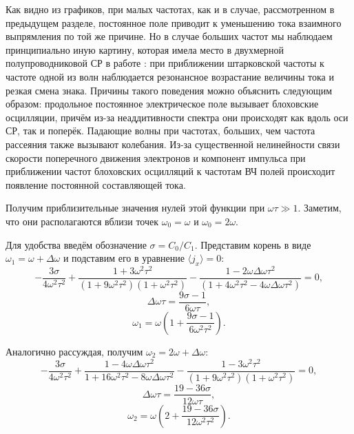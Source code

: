 Как видно из графиков, при малых частотах, как и в случае, рассмотренном в предыдущем разделе, постоянное поле приводит к уменьшению тока взаимного выпрямления по той же причине. Но в случае больших частот мы наблюдаем принципиально иную картину, которая имела место в двухмерной полупроводниковой СР в работе \cite{two-axis-sl}: при приближении штарковской частоты к частоте одной из волн наблюдается резонансное возрастание величины тока и резкая смена знака. Причины такого поведения можно объяснить следующим образом: продольное постоянное электрическое поле вызывает блоховские осцилляции, причём из-за неаддитивности спектра они происходят как вдоль оси СР, так и поперёк. Падающие волны при частотах, больших, чем частота рассеяния также вызывают колебания. Из-за существенной нелинейности связи скорости поперечного движения электронов и компонент импульса при приближении частот блоховских осцилляций к частотам ВЧ полей происходит появление постоянной составляющей тока.


Получим приблизительные значения нулей этой функции при \( \omega\tau\gg1 \).
Заметим, что они располагаются вблизи точек \( \omega_0 = \omega \) и \(
\omega_0 = 2\omega \).

Для удобства введём обозначение \( \sigma = C_0/C_1 \). Представим корень в виде
\( \omega_1 = \omega + \Delta\omega \) и подставим его в уравнение \( \langle
j_x \rangle = 0\):
\begin{equation*}
    -\frac{3\sigma}{4\omega^2\tau^2} +
    \frac{1+3\omega^2\tau^2}{(1+9\omega^2\tau^2)(1+\omega^2\tau^2)}-
    \frac{1-2\omega\Delta\omega\tau^2}{(1+4\omega^2\tau^2 -
    4\omega\Delta\omega\tau^2)}=0,
\end{equation*}
\begin{equation*}
    \Delta\omega\tau=\frac{9\sigma-1}{6\omega\tau},
\end{equation*}
\begin{equation*}
    \omega_1=\omega\left(1+\frac{9\sigma-1}{6\omega^2\tau^2}\right).
\end{equation*}

Аналогично рассуждая, получим \( \omega_2 = 2\omega + \Delta\omega \):
\begin{equation*}
    -\frac{3\sigma}{4\omega^2\tau^2} +
    \frac{1-4\omega\Delta\omega\tau^2}{1+16\omega^2\tau^2 -
    8\omega\Delta\omega\tau^2}-
    \frac{1-3\omega^2\tau^2}{(1+9\omega^2\tau^2)(1+\omega^2\tau^2)}=0,
\end{equation*}
\begin{equation*}
    \Delta\omega\tau=\frac{19 - 36\sigma}{12\omega\tau},
\end{equation*}
\begin{equation*}
    \omega_2=\omega\left(2+\frac{19-36\sigma}{12\omega^2\tau^2}\right).
\end{equation*}

